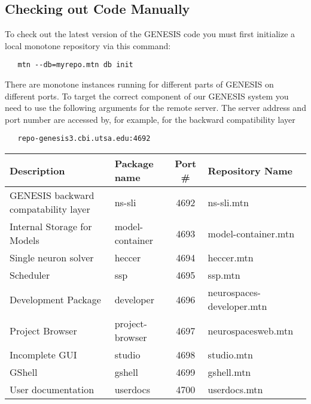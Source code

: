 \documentclass[12pt]{article}
\begin{document}
\subsection*{Checking out Code Manually}

To check out the latest version of the GENESIS code you must first initialize a local monotone repository via this command:
\begin{verbatim}
   mtn --db=myrepo.mtn db init 
\end{verbatim}
There are monotone instances running for different parts of GENESIS on different ports. To target the correct component of our GENESIS system you need to use the following arguments for the remote server. The server address and port number are accessed by, for example, for the backward compatibility layer
\begin{verbatim}
   repo-genesis3.cbi.utsa.edu:4692
\end{verbatim}

\vspace{3mm}
\begin{footnotesize}
\begin{centering}
\begin{tabular}{| l | l | c | l |}
\hline
{\bf Description}                                               & {\bf Package name}   & {\bf Port \#} & {\bf Repository Name} \\ \hline
GENESIS backward compatability layer    & ns-sli                             & 4692           & ns-sli.mtn \\ \hline
Internal Storage for Models                           & model-container        & 4693           & model-container.mtn \\ \hline
Single neuron solver                                      & heccer 	                        & 4694           & heccer.mtn \\ \hline
Scheduler                                                         & ssp                                & 4695           & ssp.mtn \\ \hline
Development Package                                  & developer                    & 4696           & neurospaces-developer.mtn \\ \hline
Project Browser                                               & project-browser          & 4697           & neurospacesweb.mtn \\ \hline
Incomplete GUI 	                                      & studio                            & 4698           & studio.mtn \\ \hline
GShell 	                                                         & gshell                            & 4699          & gshell.mtn \\ \hline
User documentation                                       & userdocs                      & 4700          & userdocs.mtn \\ \hline
\end{tabular}
\end{centering}
\end{footnotesize}
\end{document}
